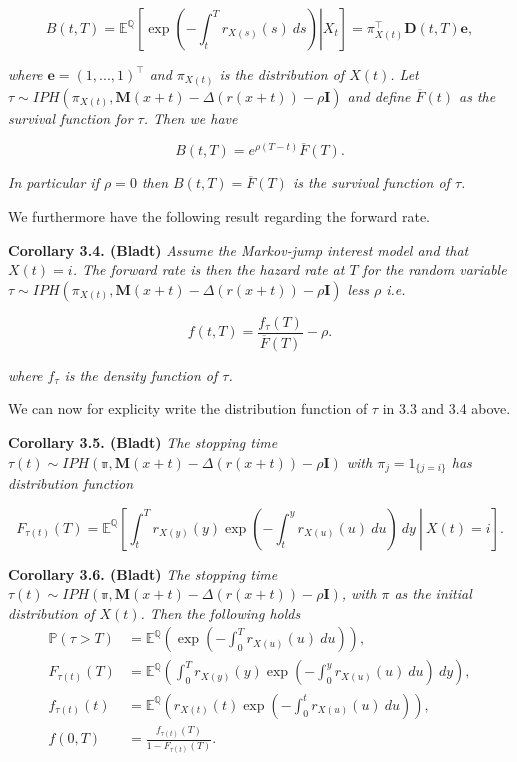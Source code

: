 \documentclass[a4paper,12pt,openany]{book}
\begin{document}
\[
B(t,T)=\mathbb E^{\mathbb Q}\left[\left.\exp\left(-\int_t^Tr_{X(s)}(s)\ ds\right) \right\vert X_t\right]=\pi_{X(t)}^\top\mathbf D(t,T)\mathbf e,
\]

\emph{where \(\mathbf e=(1,...,1)^\top\) and \(\pi_{X(t)}\) is the distribution of \(X(t)\). Let \(\tau\sim IPH(\pi_{X(t)},\mathbf M(x+t)-\Delta (r(x+t))-\rho \mathbf I)\) and define \(\overline F(t)\) as the survival function for \(\tau\). Then we have}

\[
B(t,T)=e^{\rho (T-t)}\overline F(T).
\]

\emph{In particular if \(\rho = 0\) then \(B(t,T)=\overline F(T)\) is the survival function of \(\tau\).}

We furthermore have the following result regarding the forward rate.

\textbf{Corollary 3.4. (Bladt)} \emph{Assume the Markov-jump interest model and that \(X(t)=i\). The forward rate is then the hazard rate at \(T\) for the random variable \(\tau\sim IPH(\pi_{X(t)},\mathbf M(x+t)-\Delta (r(x+t))-\rho \mathbf I)\) less \(\rho\) i.e.}

\[
f(t,T)=\frac{f_{\tau}(T)}{\overline F(T)}-\rho.
\]

\emph{where \(f_\tau\) is the density function of \(\tau\).}

We can now for explicity write the distribution function of \(\tau\) in 3.3 and 3.4 above.

\textbf{Corollary 3.5. (Bladt)} \emph{The stopping time \(\tau(t)\sim IPH(\mathbb \pi,\mathbf M(x+t)-\Delta (r(x+t))-\rho \mathbf I)\) with \(\pi_j=1_{\{j=i\}}\) has distribution function}

\[
F_{\tau(t)}(T)=\mathbb E^{\mathbb Q}\left[\left.\int_t^T r_{X(y)}(y)\exp\left(-\int_t^yr_{X(u)}(u)\ du\right)\ dy\ \right\vert\ X(t)=i\right].
\]

\textbf{Corollary 3.6. (Bladt)} \emph{The stopping time \(\tau(t)\sim IPH(\mathbb \pi,\mathbf M(x+t)-\Delta (r(x+t))-\rho \mathbf I)\), with \(\pi\) as the initial distribution of \(X(t)\). Then the following holds}
\begin{align*}
\mathbb P(\tau > T)&=\mathbb E^{\mathbb Q}\left(\exp\left(-\int_0^T r_{X(u)}(u)\ du\right)\right),\\
F_{\tau(t)}(T)&=\mathbb E^{\mathbb Q}\left(\int_0^T r_{X(y)}(y)\exp\left(-\int_0^y r_{X(u)}(u)\ du\right)\ dy\right),\\
f_{\tau(t)}(t)&=\mathbb E^{\mathbb Q}\left( r_{X(t)}(t)\exp\left(-\int_0^t r_{X(u)}(u)\ du\right)\right),\\
f(0,T)&=\frac{f_{\tau(t)}(T)}{1-F_{\tau(t)}(T)}.
\end{align*}
\end{document}
